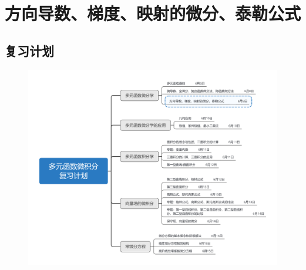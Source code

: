 \documentclass[12pt,UTF8]{ctexart}
\begin{document}
\setcounter{section}{2}
\section{方向导数、梯度、映射的微分、泰勒公式}
\noindent
\subsection{复习计划}
\begin{figure}[H]
\begin{center}
\includegraphics[height=0.5\textheight]{Figures20190609/plan.png}
\end{center}
\end{figure}
\end{document}
